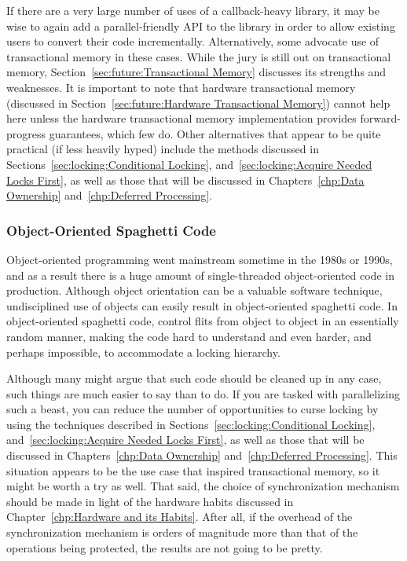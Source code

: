 If there are a very large number of uses of a callback-heavy library,
it may be wise to again add a parallel-friendly API to the library in
order to allow existing users to convert their code incrementally.
Alternatively, some advocate use of transactional memory in these cases.
While the jury is still out on transactional memory,
Section~\ref{sec:future:Transactional Memory} discusses its strengths and
weaknesses.
It is important to note that hardware transactional memory
(discussed in
Section~\ref{sec:future:Hardware Transactional Memory})
cannot help here unless the hardware transactional memory implementation
provides forward-progress guarantees, which few do.
Other alternatives that appear to be quite practical (if less heavily
hyped) include the methods discussed in
Sections~\ref{sec:locking:Conditional Locking},
and~\ref{sec:locking:Acquire Needed Locks First},
as well as those that will be discussed in
Chapters~\ref{chp:Data Ownership}
and~\ref{chp:Deferred Processing}.

\subsubsection{Object-Oriented Spaghetti Code}
\label{sec:locking:Object-Oriented Spaghetti Code}

Object-oriented programming went mainstream sometime in the 1980s or
1990s, and as a result there is a huge amount of single-threaded
object-oriented code in production.
Although object orientation can be a valuable software technique,
undisciplined use of objects can easily result in object-oriented
spaghetti code.
In object-oriented spaghetti code, control flits from object to object
in an essentially random manner, making the code hard to understand
and even harder, and perhaps impossible, to accommodate a locking hierarchy.

Although many might argue that such code should be cleaned up in any
case, such things are much easier to say than to do.
If you are tasked with parallelizing such a beast, you can reduce the
number of opportunities to curse locking by using the techniques
described in
Sections~\ref{sec:locking:Conditional Locking},
and~\ref{sec:locking:Acquire Needed Locks First},
as well as those that will be discussed in
Chapters~\ref{chp:Data Ownership}
and~\ref{chp:Deferred Processing}.
This situation appears to be the use case that inspired transactional
memory, so it might be worth a try as well.
That said, the choice of synchronization mechanism should be made in
light of the hardware habits discussed in
Chapter~\ref{chp:Hardware and its Habits}.
After all, if the overhead of the synchronization mechanism is orders of
magnitude more than that of the operations being protected, the results
are not going to be pretty.

